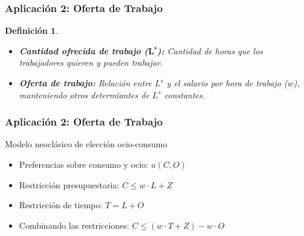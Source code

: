 \documentclass{beamer}
\newtheorem{mydef}{Definición}
\newcommand{\peq}[1]{{\scriptscriptstyle{#1}}}
\newcommand{\rp}[1]{\left(#1\right)}
\begin{document}
\begin{frame}
\begin{figure}[htbp!]
\begin{subfigure}[b]{0.49\textwidth}
{
					}
				\end{subfigure}
			\end{figure}	
		\end{frame}

		\begin{frame}
			\frametitle{Aplicación 2: Oferta de Trabajo}
			\begin{mydef}
				\begin{itemize}
					\item \textbf{Cantidad ofrecida de trabajo ($\mathbf{L^\peq{s}}$):} Cantidad de horas que los trabajadores quieren y pueden trabajar.
					\item \textbf{Oferta de trabajo:} Relación entre $L^\peq{s}$ y el salario por hora de trabajo ($w$), manteniendo otros determiantes de $L^\peq{s}$ constantes.
				\end{itemize}
			\end{mydef}
		\end{frame}	

		\begin{frame}
			\frametitle{Aplicación 2: Oferta de Trabajo}
			Modelo neoclásico de elección ocio-consumo
			\begin{itemize}
				\item Preferencias sobre consumo y ocio: $u\rp{C,O}$
				\item Restricción presupuestaria: $C\leq w\cdot L + Z$
				\item Restricción de tiempo: $T=L+O$
				\item Combinando las restricciones: $C\leq\rp{w\cdot T+Z} - w\cdot O$
			\end{itemize}
		\end{frame}	
			
\end{document}
